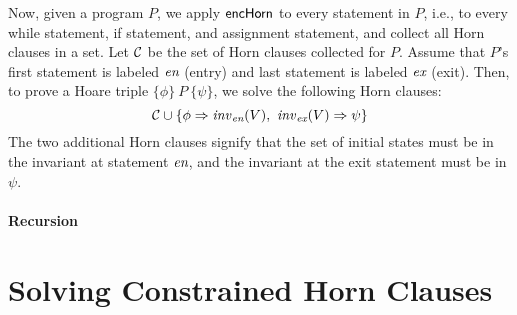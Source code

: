 \documentclass{amsart}
\theoremstyle{definition}
\theoremstyle{remark}
\numberwithin{equation}{section}
\begin{document}
Now, given a program $P$, we apply $\mathsf{encHorn}$ to every statement
in $P$, i.e., to every while statement, if statement, and assignment
statement, and collect all Horn clauses in a set.
Let $\mathcal{C}$ be the set of Horn clauses collected for $P$.
Assume that $P$'s first statement is labeled $\emph{en}$ (entry) and last statement
is labeled $\emph{ex}$ (exit).
Then, to prove a Hoare triple $\{\phi\} \ P  \ \{\psi\}$,
we solve the following Horn clauses:
%
$$ \mathcal{C} \cup \{\phi \Rightarrow \mathit{inv}_{\emph{en}}(V), \  \mathit{inv}_{\emph{ex}}(V) \Rightarrow \psi\}$$
%
The two additional Horn clauses signify that the set of initial states
must be in the invariant at statement $\emph{en}$, and the
invariant at the exit statement must be in $\psi$.

\paragraph{Recursion}
\section{Solving Constrained Horn Clauses}
\end{document}
